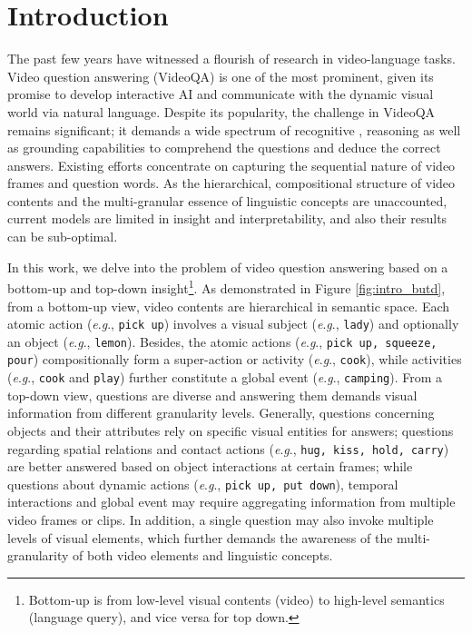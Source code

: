 \documentclass[letterpaper]{article} \usepackage{aaai21}  \usepackage{times}  \usepackage{helvet} \usepackage{courier}  \usepackage[hyphens]{url}  \usepackage{graphicx} \urlstyle{rm} \def\UrlFont{\rm}  \usepackage{natbib}  \usepackage{caption} \usepackage{color, colortbl}
\newcommand{\eg}{\textit{e}.\textit{g}.}
\begin{document}
\section{Introduction}
The past few years have witnessed a flourish of research in video-language tasks. Video question answering (VideoQA) is one of the most prominent, given its promise to develop interactive AI and communicate with the dynamic visual world via natural language. Despite its popularity, the challenge in VideoQA remains significant; it demands a wide spectrum of recognitive \cite{ren2015faster,he2016deep,carreira2017quo}, reasoning \cite{hu2018explainable} as well as grounding \cite{hu2017modeling,xiao2020visual} capabilities to comprehend the questions \cite{mao2016generation} and deduce the correct answers. Existing efforts \cite{jang2017,gao2018motion,yu2018joint,fan2019heterogeneous,li2019beyond, jiang2020divide} concentrate on capturing the sequential nature of video frames and question words. As the hierarchical, compositional structure of video contents and the multi-granular essence of linguistic concepts are unaccounted, current models are limited in insight and interpretability, and also their results can be sub-optimal.

In this work, we delve into the problem of video question answering based on a bottom-up and top-down insight\footnote{Bottom-up is from low-level visual contents (video) to high-level semantics (language query), and vice versa for top down.}. As demonstrated in Figure \ref{fig:intro_butd}, from a bottom-up view, video contents are hierarchical in semantic space. Each atomic action (\eg, \texttt{pick up}) involves a visual subject (\eg, \texttt{lady}) and optionally an object (\eg, \texttt{lemon}). Besides, the atomic actions (\eg, \texttt{pick up, squeeze, pour}) compositionally form a super-action or activity (\eg, \texttt{cook}), while activities (\eg, \texttt{cook} and \texttt{play}) further constitute a global event (\eg, \texttt{camping}). From a top-down view, questions are diverse and answering them demands visual information from different granularity levels. Generally, questions concerning objects and their attributes rely on specific visual entities for answers; questions regarding spatial relations and contact actions (\eg, \texttt{hug, kiss, hold, carry}) are better answered based on object interactions at certain frames; while questions about dynamic actions (\eg, \texttt{pick up, put down}), temporal interactions and global event may require aggregating information from multiple video frames or clips. In addition, a single question may also invoke multiple levels of visual elements, which further demands the awareness of the multi-granularity of both video elements and linguistic concepts.
\end{document}
